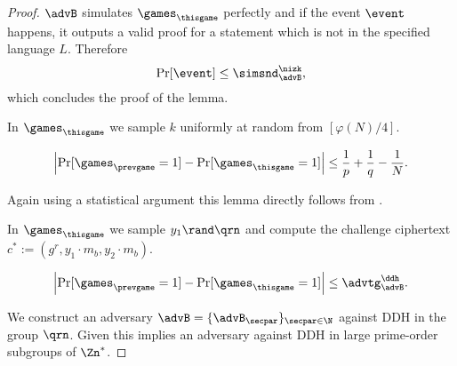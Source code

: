 \begin{proof}
$\advB$ simulates $\games_\thisgame$ perfectly and if the event $\event$ happens, it outputs a valid proof for a statement which is not in the specified language $L$. Therefore
\[\Pr[\event] \leq \simsnd^\nizk_\advB,\]
which concludes the proof of the lemma.  

%
%
%

In $\games_\thisgame$ we sample $k$ uniformly at random from $[\varphi(N)/4]$. 

\begin{lemma}
\[
\left|\Pr[\games_\prevgame = 1] - \Pr[\games_\thisgame = 1]\right| \leq \frac{1}{p}+\frac{1}{q}-\frac{1}{N}.
\]
\end{lemma}

Again using a statistical argument this lemma directly follows from .

In $\games_\thisgame$ we sample $y_1 \rand \qrn$ and compute the challenge ciphertext $c^*:=(g^r, y_1 \cdot m_b, y_2 \cdot m_b)$. 

\begin{lemma}
\[
\left|\Pr[\games_\prevgame = 1] - \Pr[\games_\thisgame = 1]\right| \leq \advtg_\advB^\ddh.
\]
\end{lemma}
We construct an adversary $\advB = \{\advB_\secpar\}_{\secpar \in \N}$ against DDH in the group $\qrn$. Given  this implies an adversary against DDH in large prime-order subgroups of $\Zn^*$.


\end{proof}
